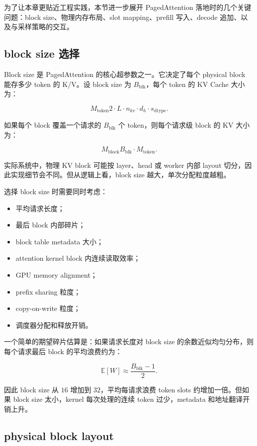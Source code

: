 为了让本章更贴近工程实践，本节进一步展开 PagedAttention 落地时的几个关键问题：block size、物理内存布局、slot mapping、prefill 写入、decode 追加、以及与采样策略的交互。

\subsection{block size 选择}
\label{subsec:block-size-choice}

Block size 是 PagedAttention 的核心超参数之一。它决定了每个 physical block 能存多少 token 的 K/V。设 block size 为 $B_{\mathrm{blk}}$，每个 token 的 KV Cache 大小为：

\[
M_{\mathrm{token}}
2
\cdot
L
\cdot
n_{kv}
\cdot
d_h
\cdot
s_{\mathrm{dtype}}.
\]

如果每个 block 覆盖一个请求的 $B_{\mathrm{blk}}$ 个 token，则每个请求级 block 的 KV 大小为：

\[
M_{\mathrm{block}}
B_{\mathrm{blk}}
\cdot
M_{\mathrm{token}}.
\]

实际系统中，物理 KV block 可能按 layer、head 或 worker 内部 layout 切分，因此实现细节会不同。但从逻辑上看，block size 越大，单次分配粒度越粗。

选择 block size 时需要同时考虑：

\begin{itemize}
\item 平均请求长度；
\item 最后 block 内部碎片；
\item block table metadata 大小；
\item attention kernel block 内连续读取效率；
\item GPU memory alignment；
\item prefix sharing 粒度；
\item copy-on-write 粒度；
\item 调度器分配和释放开销。
\end{itemize}

一个简单的期望碎片估算是：如果请求长度对 block size 的余数近似均匀分布，则每个请求最后 block 的平均浪费约为：

\[
\mathbb{E}[W]
\approx
\frac{B_{\mathrm{blk}}-1}{2}.
\]

因此 block size 从 $16$ 增加到 $32$，平均每请求浪费 token slots 约增加一倍。但如果 block size 太小，kernel 每次处理的连续 token 过少，metadata 和地址翻译开销上升。

\subsection{physical block layout}
\label{subsec:physical-block-layout}

